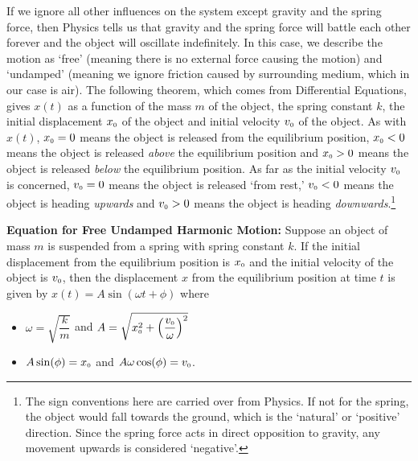 If we ignore all other influences on the system except gravity and the spring force, then Physics tells us that gravity and the spring force will battle each other forever and the object will oscillate indefinitely.  In this case, we describe the motion as `free' (meaning there is no external force causing the motion) and `undamped' (meaning we ignore friction caused by surrounding medium, which in our case is air).  The following theorem, which comes from Differential Equations, gives $x(t)$ as a function of the mass $m$ of the object, the spring constant $k$, the initial displacement $x_{\text{\tiny $0$}}$ of the object and initial velocity $v_{\text{\tiny $0$}}$ of the object.  As with $x(t)$, $x_{\text{\tiny $0$}} = 0$ means the object is released from the equilibrium position, $x_{\text{\tiny $0$}} < 0$ means the object is released \textit{above} the equilibrium position and $x_{\text{\tiny $0$}}>0$ means the object is released \textit{below} the equilibrium position.  As far as the initial velocity $v_{\text{\tiny $0$}}$ is concerned, $v_{\text{\tiny $0$}} =0 $ means the object is released `from rest,' $v_{\text{\tiny $0$}}<0$ means the object is heading \textit{upwards} and $v_{\text{\tiny $0$}}>0$ means the object is heading \textit{downwards}.\footnote{The sign conventions here are carried over from Physics.  If not for the spring, the object would fall towards the ground, which is the `natural' or `positive' direction.  Since the spring force acts in direct opposition to gravity,  any movement upwards is considered `negative'.}

\medskip

\colorbox{ResultColor}{\bbm
\begin{thm} \label{freeundampedmotion} \textbf{Equation for Free Undamped Harmonic Motion:}  Suppose an object of  mass $m$ is suspended from a spring with spring constant $k$.  If the initial displacement from the equilibrium position is $x_{\text{\tiny $0$}}$ and the initial velocity of the object is $v_{\text{\tiny $0$}}$, then the displacement $x$ from the equilibrium position at time $t$ is given by  $x(t) = A \sin(\omega t + \phi)$ where

\begin{itemize}

\item  $\omega = \sqrt{\dfrac{k}{m}}$ and $A = \sqrt{x_{\text{\tiny $0$}}^2 + \left( \dfrac{v_{\text{\tiny $0$}}}{\omega}\right)^2}$

\item $A\sin(\phi) = x_{\text{\tiny $0$}}$ and $A\omega\cos(\phi) = v_{\text{\tiny $0$}}$.

\end{itemize} 

\end{thm}

\ebm}

